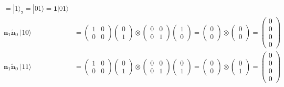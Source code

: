 \documentclass{article}
\begin{document}
\begin{align*}
      = |1\rangle_2
     = |01\rangle
     = \bm{1} |01\rangle\\
\bm{n}_1\bm{\widetilde{n}}_0 \; |10\rangle
  &= \begin{pmatrix}1 & 0\\0 & 0\end{pmatrix}
     \begin{pmatrix}0\\1\end{pmatrix}
     \otimes
     \begin{pmatrix}0 & 0\\0 & 1\end{pmatrix}
     \begin{pmatrix}1\\0\end{pmatrix}
     = \begin{pmatrix}0\\0\end{pmatrix}
     \otimes
     \begin{pmatrix}0\\0\end{pmatrix}
     = \begin{pmatrix}0\\0\\0\\0\end{pmatrix}\\
\bm{n}_1\bm{\widetilde{n}}_0 \; |11\rangle
  &= \begin{pmatrix}1 & 0\\0 & 0\end{pmatrix}
     \begin{pmatrix}0\\1\end{pmatrix}
     \otimes
     \begin{pmatrix}0 & 0\\0 & 1\end{pmatrix}
     \begin{pmatrix}0\\1\end{pmatrix}
     = \begin{pmatrix}0\\0\end{pmatrix}
     \otimes
     \begin{pmatrix}0\\1\end{pmatrix}
     = \begin{pmatrix}0\\0\\0\\0\end{pmatrix}
\end{align*}
\end{document}
